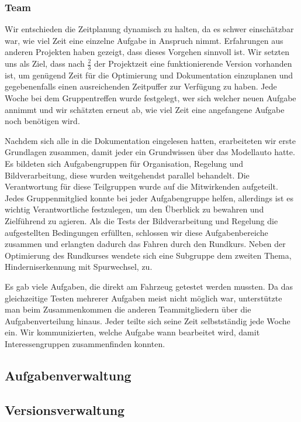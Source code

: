 \subsubsection{Team}

Wir entschieden die Zeitplanung dynamisch zu halten, da es schwer einschätzbar war, wie viel Zeit eine einzelne Aufgabe in Anspruch nimmt. Erfahrungen aus anderen Projekten haben gezeigt, dass dieses Vorgehen sinnvoll ist. Wir setzten uns als Ziel, dass nach $\frac{2}{3}$ der Projektzeit eine funktionierende Version vorhanden ist, um genügend Zeit für die Optimierung und Dokumentation einzuplanen und gegebenenfalls einen ausreichenden Zeitpuffer zur Verfügung zu haben. Jede Woche bei dem Gruppentreffen wurde festgelegt, wer sich welcher neuen Aufgabe annimmt und wir schätzten erneut ab, wie viel Zeit eine angefangene Aufgabe noch benötigen wird.


Nachdem sich alle in die Dokumentation eingelesen hatten, erarbeiteten wir erste Grundlagen zusammen, damit jeder ein Grundwissen über das Modellauto hatte. Es bildeten sich Aufgabengruppen für Organisation, Regelung und Bildverarbeitung, diese wurden weitgehendst parallel behandelt. Die Verantwortung für diese Teilgruppen wurde auf die Mitwirkenden aufgeteilt. Jedes Gruppenmitglied konnte bei jeder Aufgabengruppe helfen, allerdings ist es wichtig Verantwortliche festzulegen, um den Überblick zu bewahren und Zielführend zu agieren. Als die Tests der Bildverarbeitung und Regelung die aufgestellten Bedingungen erfüllten, schlossen wir diese Aufgabenbereiche zusammen und erlangten dadurch das Fahren durch den Rundkurs. Neben der Optimierung des Rundkurses wendete sich eine Subgruppe dem zweiten Thema, Hinderniserkennung mit Spurwechsel, zu.

Es gab viele Aufgaben, die direkt am Fahrzeug getestet werden mussten. Da das gleichzeitige Testen mehrerer Aufgaben meist nicht möglich war, unterstützte man beim Zusammenkommen die anderen Teammitgliedern über die Aufgabenverteilung hinaus. Jeder teilte sich seine Zeit selbstständig jede Woche ein. Wir kommunizierten, welche Aufgabe wann bearbeitet wird, damit Interessengruppen zusammenfinden konnten. 

\subsection{Aufgabenverwaltung}
\label{sec:aufgabenverwaltung}


\subsection{Versionsverwaltung}
\label{sec:versionsverwaltung}

